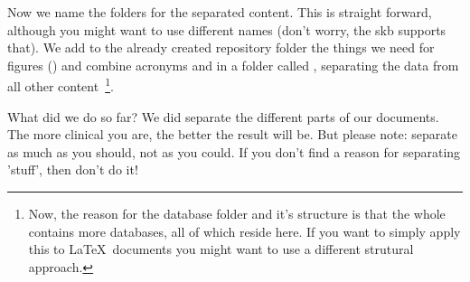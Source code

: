Now we name the folders for the separated content. This is straight forward, although you might want 
to use different names (don't worry, the skb supports that). We add to the already created repository 
folder the things we need for figures () and combine acronyms and \BibTeX in a 
folder called , separating the data from all other content~\footnote{Now, the
reason for the database folder and it's structure 
is that the whole  contains more databases, all of which reside here. If you want to simply apply this
to \LaTeX~documents you might want to use a different strutural approach.}.%
%

What did we do so far? We did separate the different parts of our 
documents. The more clinical you are, the better the result will be. But 
please note: separate as much as you should, not as you could. If you 
don't find a reason for separating 'stuff', then don't do it!